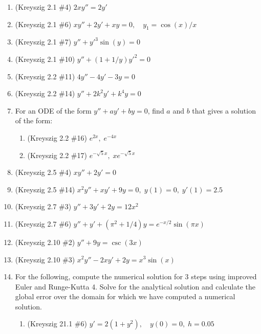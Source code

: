 \documentclass[letterpaper, fontsize=12pt]{scrartcl} %
\numberwithin{equation}{section} %
\numberwithin{figure}{section} %
\numberwithin{table}{section} %
\begin{document}
\begin{enumerate}

\item (Kreyszig 2.1 \#4) $2xy'' = 2y'$

\item (Kreyszig 2.1 \#6) $xy'' + 2y' + xy = 0, \quad y_1 = \cos(x)/x$

\item (Kreyszig 2.1 \#7) $y'' + y'^3 \sin(y) = 0$

\item (Kreyszig 2.1 \#10) $y'' + (1 + 1/y)y'^2 = 0$

\item (Kreyszig 2.2 \#11) $4y'' - 4y' - 3y = 0$

\item (Kreyszig 2.2 \#14) $y'' + 2k^2y' +  k^4y = 0$ 

\item For an ODE of the form $y'' + ay' + by = 0$, find $a$ and $b$ that gives a solution of the form:
\begin{enumerate}
\item (Kreyszig 2.2 \#16) $e^{2x}, \; e^{-4x}$

\item (Kreyszig 2.2 \#17) $e^{-\sqrt{5}x}, \; xe^{-\sqrt{5}x}$

\end{enumerate}

\item (Kreyszig 2.5 \#4) $xy'' + 2y' = 0$

\item (Kreyszig 2.5 \#14) $x^2 y'' +  xy'  + 9y = 0, \; y(1) = 0, \; y'(1) = 2.5$

\item (Kreyszig 2.7 \#3) $y'' + 3y' + 2y = 12x^2$

\item (Kreyszig 2.7 \#6) $y'' + y' + (\pi^2 + 1/4)y = e^{-x/2} \sin(\pi x)$

\item (Kreyszig 2.10 \#2) $y'' + 9y = \csc(3x)$

\item (Kreyszig 2.10 \#3) $x^2y'' - 2xy' + 2y = x^3 \sin(x)$

\item For the following, compute the numerical solution for 3 steps using improved Euler and Runge-Kutta 4. Solve for the analytical solution and calculate the global error over the domain for which we have computed a numerical solution. 
\begin{enumerate}
\item (Kreyszig 21.1 \#6) $y'  = 2(1 + y^2), \quad y(0) =0,\;  h= 0.05$


\end{enumerate}
\end{enumerate}
\end{document}
